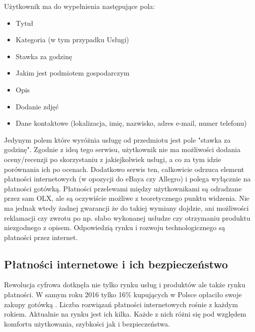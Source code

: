 \documentclass[12pt]{article}
\numberwithin{figure}{section}
\begin{document}
\begin{sloppypar}
Użytkownik ma do wypełnienia następujące pola:
\begin{itemize}
    \item Tytuł
    \item Kategoria (w tym przypadku Usługi)
    \item Stawka za godzinę
    \item Jakim jest podmiotem gospodarczym
    \item Opis
    \item Dodanie zdjęć
    \item Dane kontaktowe (lokalizacja, imię, nazwisko, adres e-mail, numer telefonu)
\end{itemize}

Jedynym polem które wyróżnia usługę od przedmiotu jest pole "stawka za godzinę". Zgodnie z ideą tego serwisu, użytkownik nie ma możliwości dodania oceny/recenzji po skorzystaniu z jakiejkolwiek usługi, a co za tym idzie porównania ich po ocenach. Dodatkowo serwis ten, całkowicie odrzuca element płatności internetowych (w opozycji do eBaya czy Allegro) i polega wyłącznie na płatności gotówką. Płatności przelewami między użytkownikami są odradzane przez sam OLX, ale są oczywiście możliwe z teoretycznego punktu widzenia. Nie ma jednak wtedy żadnej gwarancji że do takiej wymiany dojdzie, ani możliwości reklamacji czy zwrotu po np. słabo wykonanej usłudze czy otrzymaniu produktu niezgodnego z opisem. Odpowiedzią rynku i rozwoju technologicznego są płatności przez internet.

\subsection{Płatności internetowe i ich bezpieczeństwo} \label{sec:payments}
Rewolucja cyfrowa dotknęła nie tylko rynku usług i produktów ale także rynku płatności. W samym roku 2016 tylko 16\% kupujących w Polsce opłaciło swoje zakupy gotówką \cite{gotowka}. Liczba rozwiązań płatności internetowych rośnie z każdym rokiem. Aktualnie na rynku jest ich kilka. Każde z nich różni się pod względem komfortu użytkowania, szybkości jak i bezpieczeństwa. 


\end{sloppypar}
\end{document}
